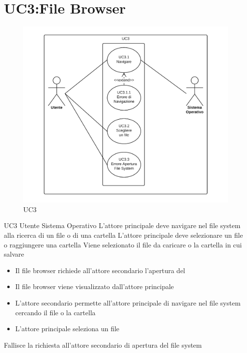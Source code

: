 \documentclass[../AnalisideiRequisiti.tex]{subfiles}
\begin{document}
	\section{UC3:File Browser}
	\begin{figure}[H]
		\caption{UC3}
		\centering
		\includegraphics[width=\textwidth]{../img/UC03.png}
	\end{figure}
	\UserCase
	{UC3}
	{Utente}
	{Sistema Operativo}
	{L'attore principale deve navigare nel file system alla ricerca di un file o di una cartella}
	{L'attore principale deve selezionare un file o raggiungere una cartella}
	{Viene selezionato il file da caricare o la cartella in cui salvare}
	{
		\begin{itemize}
			\item{} Il file browser richiede all'attore secondario l'apertura del 
			\item{} Il file browser viene visualizzato dall'attore principale
			\item{} L'attore secondario permette all'attore principale di navigare nel file system cercando il file o la cartella 
			\item{} L'attore principale seleziona un file 
		\end{itemize}
	}
	{Fallisce la richiesta all'attore secondario di apertura del file system }
	
\end{document}
